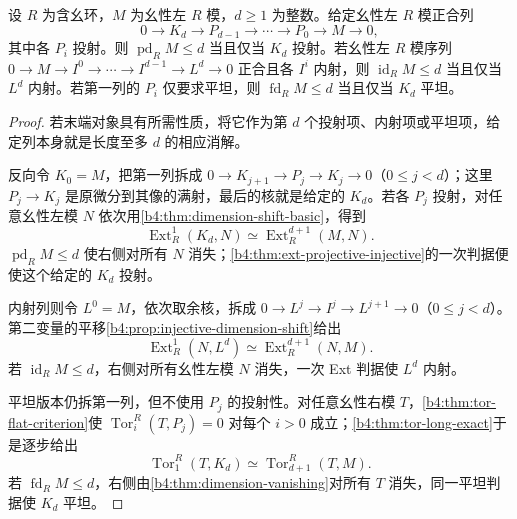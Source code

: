 \begin{proposition}\label{b4:prop:truncation-dimension}
	设 \(R\) 为含幺环，\(M\) 为幺性左 \(R\) 模，\(d\ge1\) 为整数。给定幺性左 \(R\) 模正合列
	\[
		0\longrightarrow K_d\longrightarrow P_{d-1}\longrightarrow\cdots \longrightarrow P_0\longrightarrow M\longrightarrow0,
	\]
	其中各 \(P_i\) 投射。则 \(\operatorname{pd}_RM\le d\) 当且仅当 \(K_d\) 投射。若幺性左 \(R\) 模序列 \(0\to M\to I^0\to\cdots\to I^{d-1}\to L^d\to0\) 正合且各 \(I^i\) 内射，则 \(\operatorname{id}_RM\le d\) 当且仅当 \(L^d\) 内射。若第一列的 \(P_i\) 仅要求平坦，则 \(\operatorname{fd}_RM\le d\) 当且仅当 \(K_d\) 平坦。
\end{proposition}
\begin{proof}
	若末端对象具有所需性质，将它作为第 \(d\) 个投射项、内射项或平坦项，给定列本身就是长度至多 \(d\) 的相应消解。

	反向令 \(K_0=M\)，把第一列拆成 \(0\to K_{j+1}\to P_j\to K_j\to0\)（\(0\le j<d\)）；这里 \(P_j\to K_j\) 是原微分到其像的满射，最后的核就是给定的 \(K_d\)。若各 \(P_j\) 投射，对任意幺性左模 \(N\) 依次用\cref{b4:thm:dimension-shift-basic}，得到
	\[
		\operatorname{Ext}_R^1(K_d,N)\simeq\operatorname{Ext}_R^{d+1}(M,N).
	\]
	\(\operatorname{pd}_RM\le d\) 使右侧对所有 \(N\) 消失；\cref{b4:thm:ext-projective-injective}的一次判据便使这个给定的 \(K_d\) 投射。

	内射列则令 \(L^0=M\)，依次取余核，拆成 \(0\to L^j\to I^j\to L^{j+1}\to0\)（\(0\le j<d\)）。第二变量的平移\cref{b4:prop:injective-dimension-shift}给出
	\[
		\operatorname{Ext}_R^1(N,L^d)\simeq\operatorname{Ext}_R^{d+1}(N,M).
	\]
	若 \(\operatorname{id}_RM\le d\)，右侧对所有幺性左模 \(N\) 消失，一次 Ext 判据使 \(L^d\) 内射。

	平坦版本仍拆第一列，但不使用 \(P_j\) 的投射性。对任意幺性右模 \(T\)，\cref{b4:thm:tor-flat-criterion}使 \(\operatorname{Tor}_i^R(T,P_j)=0\) 对每个 \(i>0\) 成立；\cref{b4:thm:tor-long-exact}于是逐步给出
	\[
		\operatorname{Tor}_1^R(T,K_d)\simeq\operatorname{Tor}_{d+1}^R(T,M).
	\]
	若 \(\operatorname{fd}_RM\le d\)，右侧由\cref{b4:thm:dimension-vanishing}对所有 \(T\) 消失，同一平坦判据使 \(K_d\) 平坦。
\end{proof}

